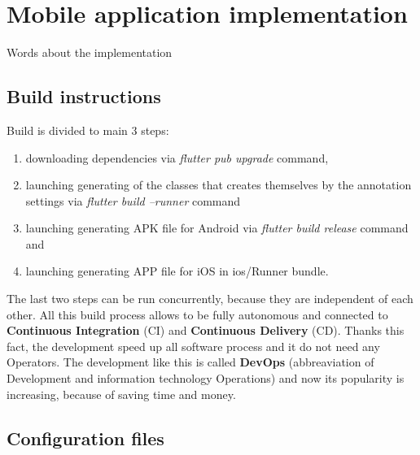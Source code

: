 \chapter{Mobile application implementation}\label{ch:mobile-application-implementation}

Words about the implementation

\section{Build instructions}\label{sec:build-instructions}
Build is divided to main 3 steps:
\begin{enumerate}
    \item downloading dependencies via \textit{flutter pub upgrade} command,
    \item launching generating of the classes that creates themselves by the annotation settings via \textit{flutter build --runner} command
    \item launching generating APK file for Android via \textit{flutter build release} command and
    \item launching generating APP file for iOS in ios/Runner bundle.
\end{enumerate}
The last two steps can be run concurrently, because they are independent of each other.
All this build process allows to be fully autonomous and connected to \textbf{Continuous Integration} (CI) and \textbf{Continuous Delivery} (CD).
Thanks this fact, the development speed up all software process and it do not need any Operators.
The development like this is called \textbf{DevOps} (abbreaviation of Development and information technology Operations) and now its popularity is increasing, because of saving time and money.

\section{Configuration files}\label{sec:configuration-files}


